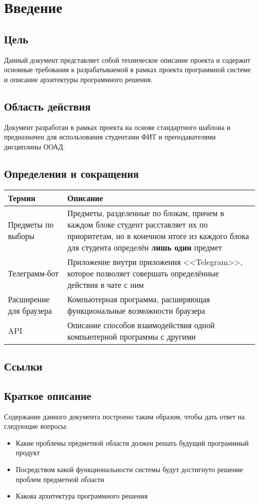\chapter{Введение}
	\label{1}

	\section{Цель}
		Данный документ представляет собой техническое описание проекта \ProjectName и содержит основные требования к разрабатываемой в рамках проекта программной системе и описание архитектуры программного решения.
	\section{Область действия}
		Документ разработан в рамках проекта \ProjectName на основе стандартного шаблона и предназначен для использования студентами ФИТ и преподавателями дисциплины ООАД.
	\section{Определения и сокращения}
		\begin{tabularx}{\textwidth}{
				| >{\centering\arraybackslash\hsize=5cm}X
				| >{\centering\arraybackslash}X
				|}\hline
			\textbf{Термин} & \textbf{Описание} \\\hline
			Предметы по выборы & Предметы, разделенные по блокам, причем в каждом блоке студент расставляет их по приоритетам, но в конечном итоге из каждого блока для студента определён \textbf{лишь один} предмет \\\hline
			Телеграмм-бот & Приложение внутри приложения <<Telegram>>, которое позволяет совершать определённые действия в чате с ним \\\hline
			Расширение для браузера & Компьютерная программа, расширяющая функциональные возможности браузера \\\hline
			API & Описание способов взаимодействия одной компьютерной программы с другими \\\hline
		\end{tabularx}
	\section{Ссылки}

	\section{Краткое описание}
		Содержание данного документа построено таким образом, чтобы дать ответ на следующие вопросы:
		\begin{itemize}
			\item Какие проблемы предметной области должен решать будущий программный продукт
			
			\item Посредством какой функциональности системы будут достигнуто решение проблем предметной области
			
			\item Какова архитектура программного решения
		\end{itemize}
	
